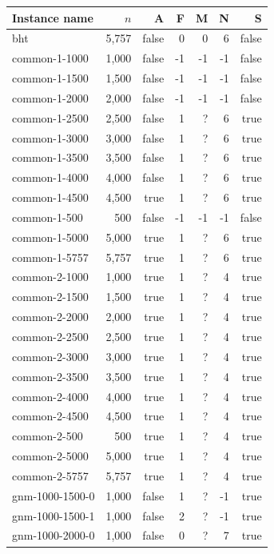 \medskip
\begin{tabular}{lrrrrrr}
  \toprule
  Instance name & $n$ & A & F & M & N & S \\
  \midrule
  bht & 5,757 & false & 0 & 0 & 6 & false \\
  common-1-1000 & 1,000 & false & -1 & -1 & -1 & false \\
  common-1-1500 & 1,500 & false & -1 & -1 & -1 & false \\
  common-1-2000 & 2,000 & false & -1 & -1 & -1 & false \\
  common-1-2500 & 2,500 & false & 1 & ? & 6 & true \\
  common-1-3000 & 3,000 & false & 1 & ? & 6 & true \\
  common-1-3500 & 3,500 & false & 1 & ? & 6 & true \\
  common-1-4000 & 4,000 & false & 1 & ? & 6 & true \\
  common-1-4500 & 4,500 & true & 1 & ? & 6 & true \\
  common-1-500 & 500 & false & -1 & -1 & -1 & false \\
  common-1-5000 & 5,000 & true & 1 & ? & 6 & true \\
  common-1-5757 & 5,757 & true & 1 & ? & 6 & true \\
  common-2-1000 & 1,000 & true & 1 & ? & 4 & true \\
  common-2-1500 & 1,500 & true & 1 & ? & 4 & true \\
  common-2-2000 & 2,000 & true & 1 & ? & 4 & true \\
  common-2-2500 & 2,500 & true & 1 & ? & 4 & true \\
  common-2-3000 & 3,000 & true & 1 & ? & 4 & true \\
  common-2-3500 & 3,500 & true & 1 & ? & 4 & true \\
  common-2-4000 & 4,000 & true & 1 & ? & 4 & true \\
  common-2-4500 & 4,500 & true & 1 & ? & 4 & true \\
  common-2-500 & 500 & true & 1 & ? & 4 & true \\
  common-2-5000 & 5,000 & true & 1 & ? & 4 & true \\
  common-2-5757 & 5,757 & true & 1 & ? & 4 & true \\
  gnm-1000-1500-0 & 1,000 & false & 1 & ? & -1 & true \\
  gnm-1000-1500-1 & 1,000 & false & 2 & ? & -1 & true \\
  gnm-1000-2000-0 & 1,000 & false & 0 & ? & 7 & true \\

\end{tabular}
